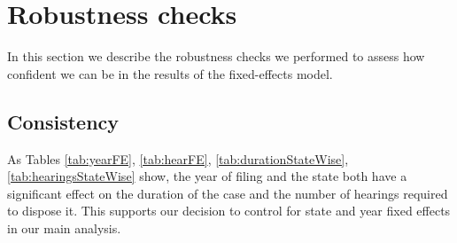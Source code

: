

\section{Robustness checks}\label{sec:robustness}
In this section we describe the robustness checks we performed to assess how confident we can be in the results of the fixed-effects model.

\subsection{Consistency}
\label{sec:consistency}
As Tables \ref{tab:yearFE}, \ref{tab:hearFE}, \ref{tab:durationStateWise}, \ref{tab:hearingsStateWise} show, the year of filing and the state both have a significant effect on the duration of the case and the number of hearings required to dispose it. This supports our decision to control for state and year fixed effects in our main analysis.

